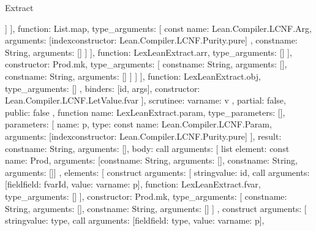 \begin{lexlean}{Extract}
\begin{toolingmodule}
{{{{{{{{{{                                  ]
                                }
                              ],
                              function: List.map,
                              type_arguments: [
                                const{
                                  name: Lean.Compiler.LCNF.Arg,
                                  arguments: [index{constructor: Lean.Compiler.LCNF.Purity.pure}]
                                },
                                const{name: String, arguments: []}
                              ]
                            }
                          ],
                          function: LexLeanExtract.arr,
                          type_arguments: []
                        }
                      ],
                      constructor: Prod.mk,
                      type_arguments: [
                        const{name: String, arguments: []},
                        const{name: String, arguments: []}
                      ]
                    }
                  ]
                }
              ],
              function: LexLeanExtract.obj,
              type_arguments: []
            },
            binders: [id, args],
            constructor: Lean.Compiler.LCNF.LetValue.fvar
          }
        ],
        scrutinee: var{name: v}
      },
      partial: false,
      public: false
    },
    function{
      name: LexLeanExtract.param,
      type_parameters: [],
      parameters: [
        {
          name: p,
          type: const{
            name: Lean.Compiler.LCNF.Param,
            arguments: [index{constructor: Lean.Compiler.LCNF.Purity.pure}]
          }
        }
      ],
      result: const{name: String, arguments: []},
      body: call{
        arguments: [
          list{
            element: const{
              name: Prod,
              arguments: [const{name: String, arguments: []}, const{name: String, arguments: []}]
            },
            elements: [
              construct{
                arguments: [
                  string{value: id},
                  call{
                    arguments: [field{field: fvarId, value: var{name: p}}],
                    function: LexLeanExtract.fvar,
                    type_arguments: []
                  }
                ],
                constructor: Prod.mk,
                type_arguments: [
                  const{name: String, arguments: []},
                  const{name: String, arguments: []}
                ]
              },
              construct{
                arguments: [
                  string{value: type},
                  call{
                    arguments: [field{field: type, value: var{name: p}}],
}}}}}}
\end{toolingmodule}
\end{lexlean}
